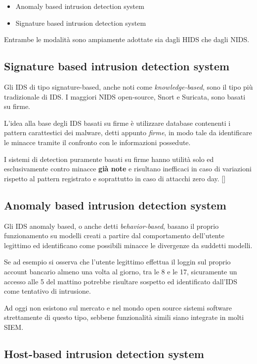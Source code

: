 \documentclass{ldr-article}
\begin{document}
\begin{itemize}
  \item Anomaly based intrusion detection system
  \item Signature based intrusion detection system
\end{itemize}

Entrambe le modalità sono ampiamente adottate sia dagli HIDS che dagli NIDS.

\subsection{Signature based intrusion detection system}

Gli IDS di tipo signature-based, anche noti come \textit{knowledge-based}, sono il tipo più tradizionale di IDS. I maggiori NIDS open-source, Snort e Suricata, sono basati su firme. 

L'idea alla base degli IDS basati su firme è utilizzare database contenenti i pattern carattestici dei malware, detti appunto \textit{firme}, in modo tale da identificare le minacce tramite il confronto con le informazioni possedute.

I sistemi di detection puramente basati su firme hanno utilità solo ed esclusivamente contro minacce \textbf{già note} e risultano inefficaci in caso di variazioni rispetto al pattern registrato e soprattutto in caso di attacchi zero day. [\cite{watch-guard-report}]

\subsection{Anomaly based intrusion detection system}
Gli IDS anomaly based, o anche detti \textit{behavior-based}, basano il proprio funzionamento su modelli creati a partire dal comportamento dell'utente legittimo ed identificano come possibili minacce le divergenze da suddetti modelli.

Se ad esempio si osserva che l'utente legittimo effettua il loggin sul proprio account bancario almeno una volta al giorno, tra le 8 e le 17, sicuramente un accesso alle 5 del mattino potrebbe risultare sospetto ed identificato dall'IDS come tentativo di intrusione.

Ad oggi non esistono sul mercato e nel mondo open source sistemi software strettamente di questo tipo, sebbene funzionalità simili siano integrate in molti SIEM.

\subsection{Host-based intrusion detection system}
\end{document}
